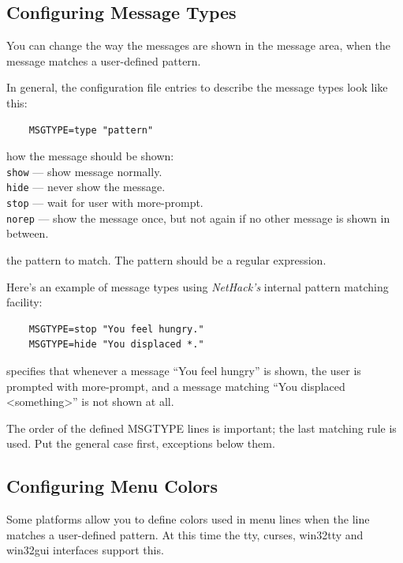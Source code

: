 \documentclass[titlepage]{article}
\begin{document}
\subsection*{Configuring Message Types}

You can change the way the messages are shown in the message area, when
the message matches a user-defined pattern.

In general, the configuration file entries to describe the message types
look like this:
\begin{verbatim}
    MSGTYPE=type "pattern"
\end{verbatim}
\begin{description}[font=\mdseries\itshape]
\item[type]
how the message should be shown:
\\
\texttt{show}  --- show message normally.\\
\texttt{hide}  --- never show the message.\\
\texttt{stop}  --- wait for user with more-prompt.\\
\texttt{norep} --- show the message once, but not again if no other message is
shown in between.
\item[pattern]
the pattern to match. The pattern should be a regular expression.
\end{description}

Here's an example of message types using \textit{NetHack's} internal
pattern matching facility:

\begin{verbatim}
    MSGTYPE=stop "You feel hungry."
    MSGTYPE=hide "You displaced *."
\end{verbatim}

specifies that whenever a message ``You feel hungry'' is shown,
the user is prompted with more-prompt, and a message matching
``You displaced  <something>'' is not shown at all.

The order of the defined MSGTYPE lines is important; the last matching
rule is used. Put the general case first, exceptions below them.


\subsection*{Configuring Menu Colors}

Some platforms allow you to define colors used in menu lines when the
line matches a user-defined pattern.
At this time the tty, curses, win32tty and
win32gui interfaces support this.
\end{document}
